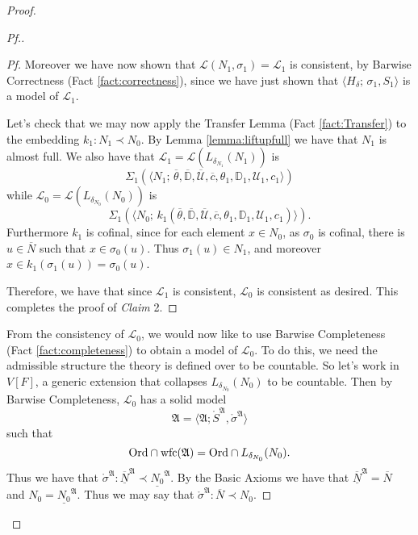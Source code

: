 \documentclass{amsart}
\theoremstyle{definition}
\theoremstyle{remark}
\newcommand{\D}{\mathbb{D}}
\newcommand{\N}{{\overline{N}}}
\newcommand{\U}{\mathcal{U}}
\newcommand{\Ord}{\textup{\ensuremath{\text{Ord}}}}
\DeclareMathOperator{\wfc}{wfc}
\begin{document}
\begin{proof}
\begin{proof}[Pf.]
\begin{proof}[Pf]
Moreover we have now shown that $\mathcal L(N_1, \sigma_1) = \mathcal L_1$ is consistent, by Barwise Correctness (Fact \ref{fact:correctness}), since we have just shown that $\langle H_{\delta}; \, \sigma_1, S_1 \rangle$ is a model of $\mathcal L_1$.

Let's check that we may now apply the Transfer Lemma (Fact \ref{fact:Transfer}) to the embedding $k_1:N_1 \prec N_0$. By Lemma \ref{lemma:liftupfull} we have that $N_1$ is almost full. We also have that $\mathcal L_1 = \mathcal L(L_{\delta_{N_1}}(N_1))$ is 
	$$\text{$\Sigma_1(\langle N_1; \, \overline \theta, \overline{\D}, \overline{\U}, \overline c, \theta_1, \D_1, \U_1, c_1 \rangle)$}$$ while $\mathcal L_0=\mathcal L(L_{\delta_{N_0}}(N_0))$ is 
	$$\text{$\Sigma_1(\langle N_0;\,k_1(\overline \theta, \overline{\D}, \overline{\U}, \overline c, \theta_1, \D_1, \U_1, c_1)\rangle)$.}$$ 
Furthermore $k_1$ is cofinal, since for each element $x \in N_0$, as $\sigma_0$ is cofinal, there is $u \in \N$ such that $x \in \sigma_0(u)$. Thus $\sigma_1(u) \in N_1$, and moreover $x \in k_1(\sigma_1(u))=\sigma_0(u)$. 

Therefore, we have that since $\mathcal L_1$ is consistent, $\mathcal L_0$ is consistent as desired. This completes the proof of \textit{Claim} 2. \end{proof}


From the consistency of $\mathcal L_0$, we would now like to use Barwise Completeness (Fact \ref{fact:completeness}) to obtain a model of $\mathcal L_0$. To do this, we need the admissible structure the theory is defined over to be countable. So let's work in $V[F]$, a generic extension that collapses $L_{\delta_{N_0}}(N_0)$ to be countable. Then by Barwise Completeness, $\mathcal L_0$ has a solid model 
	$$\mathfrak A = \langle \mathfrak A; \mathring{S}^{\mathfrak A}, \mathring{\sigma}^{\mathfrak A} \rangle$$ such that $$\Ord \cap \wfc(\mathfrak A) = \Ord \cap L_{\delta_{N_0}}(N_0).$$ 
Thus we have that $\mathring \sigma^{\mathfrak A}: \overline{\underline N}^{\mathfrak A} \prec \underline{N_0}^{\mathfrak A}$. By the \textsf{Basic Axioms} we have that $\overline{\underline N}^{\mathfrak A}=\N$ and $N_0=\underline{N_0}^{\mathfrak A}$. Thus we may say that  $\mathring \sigma^{\mathfrak A}: \N \prec N_0$. 


\end{proof}
\end{proof}
\end{document}
